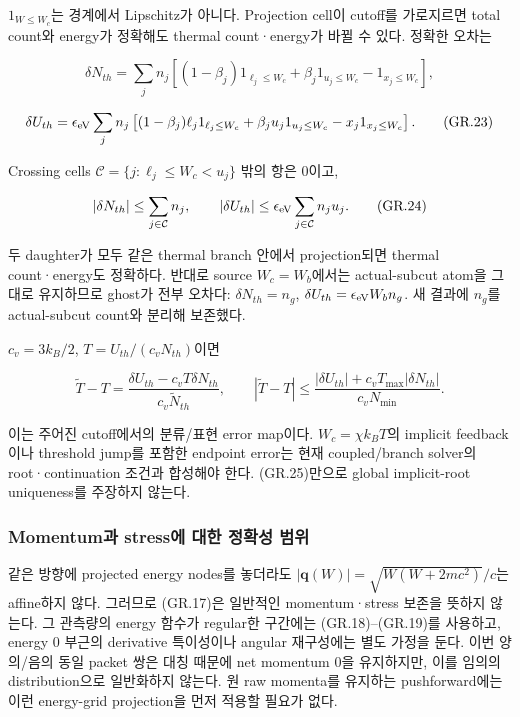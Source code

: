\documentclass[11pt,a4paper]{article}
\begin{document}
\(1_{W\le W_c}\)는 경계에서 Lipschitz가 아니다. Projection cell이 cutoff를 가로지르면 total count와 energy가 정확해도 thermal count·energy가 바뀔 수 있다. 정확한 오차는

\[
 \delta N_{th}=\sum_jn_j\left[(1-\beta_j)1_{\ell_j\le W_c}
        +\beta_j1_{u_j\le W_c}-1_{x_j\le W_c}\right],
\tag{GR.22}
\]

\[
 \delta U_{th}=\epsilon_{\rm eV}\sum_jn_j\left[(1-\beta_j)\ell_j1_{\ell_j\le W_c}
        +\beta_ju_j1_{u_j\le W_c}-x_j1_{x_j\le W_c}\right].
\tag{GR.23}
\]

Crossing cells \(\mathcal C=\{j:\ell_j\le W_c<u_j\}\) 밖의 항은 0이고,

\[
 |\delta N_{th}|\le\sum_{j\in\mathcal C}n_j,\qquad
 |\delta U_{th}|\le\epsilon_{\rm eV}\sum_{j\in\mathcal C}n_ju_j.
\tag{GR.24}
\]

두 daughter가 모두 같은 thermal branch 안에서 projection되면 thermal count·energy도 정확하다. 반대로 source \(W_c=W_b\)에서는 actual-subcut atom을 그대로 유지하므로 ghost가 전부 오차다: \(\delta N_{th}=n_g\), \(\delta U_{th}=\epsilon_{\rm eV}W_bn_g\). 새 결과에 \(n_g\)를 actual-subcut count와 분리해 보존했다.

\(c_v=3k_B/2\), \(T=U_{th}/(c_vN_{th})\)이면

\[
 \widetilde T-T=
 \frac{\delta U_{th}-c_vT\delta N_{th}}{c_v\widetilde N_{th}},\qquad
 |\widetilde T-T|\le
 \frac{|\delta U_{th}|+c_vT_{\max}|\delta N_{th}|}{c_vN_{\min}}.
\tag{GR.25}
\]

이는 주어진 cutoff에서의 분류/표현 error map이다. \(W_c=\chi k_BT\)의 implicit feedback이나 threshold jump를 포함한 endpoint error는 현재 coupled/branch solver의 root·continuation 조건과 합성해야 한다. (GR.25)만으로 global implicit-root uniqueness를 주장하지 않는다.

\hypertarget{momentumuxacfc-stressuxc5d0-uxb300uxd55c-uxc815uxd655uxc131-uxbc94uxc704}{%
\subsubsection{Momentum과 stress에 대한 정확성 범위}\label{momentumuxacfc-stressuxc5d0-uxb300uxd55c-uxc815uxd655uxc131-uxbc94uxc704}}

같은 방향에 projected energy nodes를 놓더라도 \(|\mathbf q(W)|=\sqrt{W(W+2mc^2)}/c\)는 affine하지 않다. 그러므로 (GR.17)은 일반적인 momentum·stress 보존을 뜻하지 않는다. 그 관측량의 energy 함수가 regular한 구간에는 (GR.18)--(GR.19)를 사용하고, energy 0 부근의 derivative 특이성이나 angular 재구성에는 별도 가정을 둔다. 이번 양의/음의 동일 packet 쌍은 대칭 때문에 net momentum 0을 유지하지만, 이를 임의의 distribution으로 일반화하지 않는다. 원 raw momenta를 유지하는 pushforward에는 이런 energy-grid projection을 먼저 적용할 필요가 없다.
\end{document}
